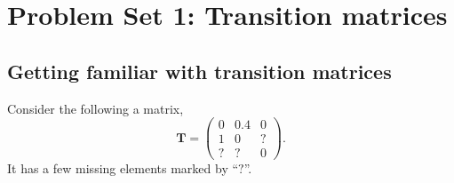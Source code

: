\documentclass[12pt]{article}
\begin{document}

\newcommand{\hint}[1]{{\color{dark-brown}\small #1}}

\section{Problem Set 1: Transition matrices}


\subsection{Getting familiar with transition matrices}


Consider the following a matrix,
\begin{equation}
  \mathbf T
  =
  \left(
    \begin{array}{ccc}
    0       &   0.4   &   0       \\
    1       &   0     &   ?  \\
    ?       &   ?     &   0
    \end{array}
  \right)
  .
\end{equation}
It has a few missing elements marked by ``$?$''.
\end{document}
